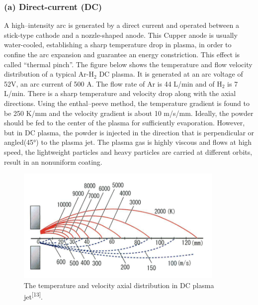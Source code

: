 \subsubsection{(a)	Direct-current (DC)}
A high--intensity arc is generated by a direct current and operated between a stick-type cathode and a nozzle-shaped anode. This Cupper anode is usually water-cooled, establishing a sharp temperature drop in plasma, in order to confine the arc expansion and guarantee an energy constriction. This effect is called “thermal pinch”. The figure below shows the temperature and flow velocity distribution of a typical Ar-$\mathrm{H_{2}}$ DC plasma. It is generated at an arc voltage of 52V, an arc current of 500 A. The flow rate of Ar is 44 L/min and of $\mathrm{H_{2}}$ is 7 L/min. There is a sharp temperature and velocity drop along with the axial directions. Using the enthal--peeve method, the temperature gradient is found to be 250 K/mm and the velocity gradient is about 10 m/s/mm. Ideally, the powder should be fed to the center of the plasma for sufficiently evaporation. However, but in DC plasma, the powder is injected in the direction that is perpendicular or angled(45°) to the plasma jet. The plasma gas is highly viscous and flows at high speed, the lightweight particles and heavy particles are carried at different orbits, result in an nonuniform coating.
\begin{figure}[H]
\centering
\includegraphics[width=10cm]{src/fig/fig13.png}
\caption{The temperature and velocity axial distribution in DC plasma jet\textsuperscript{[13]}.}
\end{figure}

